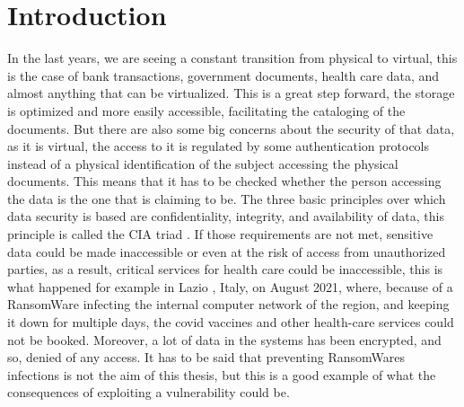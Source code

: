 \chapter{Introduction}
\label{chap:introduction}
In the last years, we are seeing a constant transition from physical to virtual, this is the case of bank transactions, government documents, health care data, and almost anything that can be virtualized. This is a great step forward, the storage is optimized and more easily accessible, facilitating the cataloging of the documents. But there are also some big concerns about the security of that data, as it is virtual, the access to it is regulated by some authentication protocols instead of a physical identification of the subject accessing the physical documents. This means that it has to be checked whether the person accessing the data is the one that is claiming to be. The three basic principles over which data security is based are confidentiality, integrity, and availability of data, this principle is called the CIA triad \cite{cia_triad}.
If those requirements are not met, sensitive data could be made inaccessible or even at the risk of access from unauthorized parties, as a result, critical services for health care could be inaccessible, this is what happened for example in Lazio \cite{lazio_hacker_0,lazio_hacker_1}, Italy, on August 2021, where, because of a RansomWare infecting the internal computer network of the region, and keeping it down for multiple days, the covid vaccines and other health-care services could not be booked. Moreover, a lot of data in the systems has been encrypted, and so, denied of any access. It has to be said that preventing RansomWares infections is not the aim of this thesis, but this is a good example of what the consequences of exploiting a vulnerability could be. 

